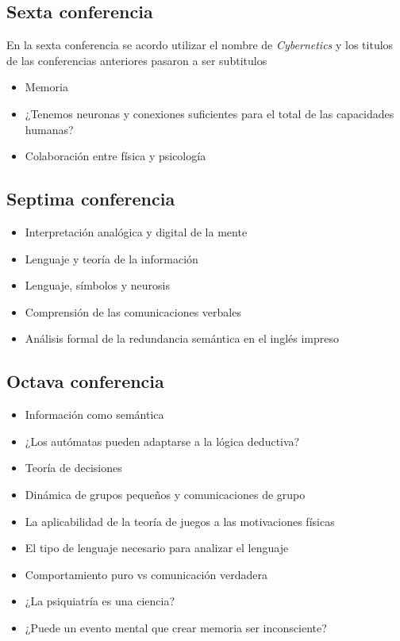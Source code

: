 \documentclass[a4paper, 12pt]{article}
\begin{document}
\subsection{Sexta conferencia}
En la sexta conferencia se acordo utilizar el nombre de \textit{Cybernetics} y los titulos de las conferencias anteriores pasaron a ser subtitulos
\begin{itemize}
 \item Memoria
 \item ¿Tenemos neuronas y conexiones suficientes para el total de las capacidades
humanas?
\item Colaboración entre física y psicología
\end{itemize}

\subsection{Septima conferencia}
\begin{itemize}
 \item Interpretación analógica y digital de la mente
 \item Lenguaje y teoría de la información
 \item Lenguaje, símbolos y neurosis
 \item Comprensión de las comunicaciones verbales
 \item Análisis formal de la redundancia semántica en el inglés impreso
\end{itemize}

\subsection{Octava conferencia}
\begin{itemize}
 \item Información como semántica
 \item ¿Los autómatas pueden adaptarse a la lógica deductiva?
 \item Teoría de decisiones
 \item Dinámica de grupos pequeños y comunicaciones de grupo
 \item La aplicabilidad de la teoría de juegos a las motivaciones físicas
 \item El tipo de lenguaje necesario para analizar el lenguaje
 \item Comportamiento puro vs comunicación verdadera
 \item ¿La psiquiatría es una ciencia?
 \item ¿Puede un evento mental que crear memoria ser inconsciente?
\end{itemize}
\end{document}
